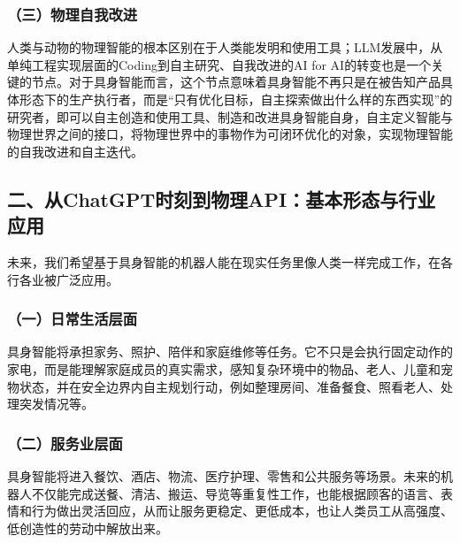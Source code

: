 \hypertarget{ux4e09ux7269ux7406ux81eaux6211ux6539ux8fdb}{%
\subsubsection{（三）物理自我改进}\label{ux4e09ux7269ux7406ux81eaux6211ux6539ux8fdb}}

人类与动物的物理智能的根本区别在于人类能发明和使用工具；LLM发展中，从单纯工程实现层面的Coding到自主研究、自我改进的AI for AI的转变也是一个关键的节点。对于具身智能而言，这个节点意味着具身智能不再只是在被告知产品具体形态下的生产执行者，而是``只有优化目标，自主探索做出什么样的东西实现''的研究者，即可以自主创造和使用工具、制造和改进具身智能自身，自主定义智能与物理世界之间的接口，将物理世界中的事物作为可闭环优化的对象，实现物理智能的自我改进和自主迭代。

\hypertarget{ux4e8cux4ecechatgptux65f6ux523bux5230ux7269ux7406apiux57faux672cux5f62ux6001ux4e0eux884cux4e1aux5e94ux7528}{%
\subsection{二、从ChatGPT时刻到物理API：基本形态与行业应用}\label{ux4e8cux4ecechatgptux65f6ux523bux5230ux7269ux7406apiux57faux672cux5f62ux6001ux4e0eux884cux4e1aux5e94ux7528}}

未来，我们希望基于具身智能的机器人能在现实任务里像人类一样完成工作，在各行各业被广泛应用。

\hypertarget{ux4e00ux65e5ux5e38ux751fux6d3bux5c42ux9762}{%
\subsubsection{（一）日常生活层面}\label{ux4e00ux65e5ux5e38ux751fux6d3bux5c42ux9762}}

具身智能将承担家务、照护、陪伴和家庭维修等任务。它不只是会执行固定动作的家电，而是能理解家庭成员的真实需求，感知复杂环境中的物品、老人、儿童和宠物状态，并在安全边界内自主规划行动，例如整理房间、准备餐食、照看老人、处理突发情况等。

\hypertarget{ux4e8cux670dux52a1ux4e1aux5c42ux9762}{%
\subsubsection{（二）服务业层面}\label{ux4e8cux670dux52a1ux4e1aux5c42ux9762}}

具身智能将进入餐饮、酒店、物流、医疗护理、零售和公共服务等场景。未来的机器人不仅能完成送餐、清洁、搬运、导览等重复性工作，也能根据顾客的语言、表情和行为做出灵活回应，从而让服务更稳定、更低成本，也让人类员工从高强度、低创造性的劳动中解放出来。

